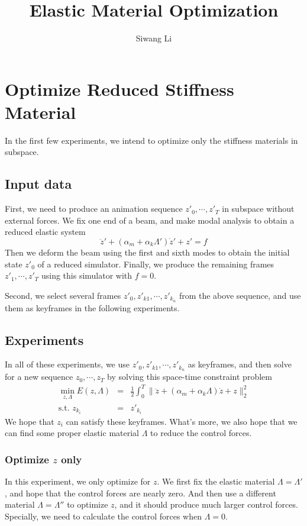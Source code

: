 \documentclass[9pt,twocolumn]{extarticle}
\author{Siwang Li}
\title{Elastic Material Optimization}
\begin{document}
\maketitle

\setlength{\parskip}{0.5ex}

\section{Optimize Reduced Stiffness Material}
In the first few experiments, we intend to optimize only the stiffness materials
in subspace.

\subsection{Input data}
First, we need to produce an animation sequence $z'_0,\cdots,z'_{T}$ in subspace
without external forces. We fix one end of a beam, and make modal analysis to
obtain a reduced elastic system
\begin{equation} \label{mq}
  \ddot{z}' + (\alpha_m+\alpha_k \Lambda')\dot{z}' + z' = f
\end{equation} 
Then we deform the beam using the first and sixth modes to obtain the initial
state $z'_0$ of a reduced simulator. Finally, we produce the remaining frames
$z'_1,\cdots,z'_{T}$ using this simulator with $f=0$. 

Second, we select several frames $z'_{0},z'_{k1},\cdots,z'_{k_n}$ from the above
sequence, and use them as keyframes in the following experiments.

\subsection{Experiments}
In all of these experiments, we use $z'_{0},z'_{k1},\cdots,z'_{k_n}$ as keyframes,
and then solve for a new sequence $z_0,\cdots,z_{T}$ by solving this
space-time constraint problem
\begin{eqnarray} \label{sp}
  \min_{z,\Lambda} E(z,\Lambda) &=& \frac{1}{2} \int_{0}^{T}\|\ddot{z} +
  (\alpha_m+\alpha_k \Lambda)\dot{z} + z\|_2^2\\
  \mbox{s.t. } z_{k_i} &=& z'_{k_i}
\end{eqnarray}
We hope that $z_i$ can satisfy these keyframes. What's
more, we also hope that we can find some proper elastic material $\Lambda$ to
reduce the control forces. 

\subsubsection{Optimize $z$ only}
In this experiment, we only optimize for $z$. We first fix the elastic material
$\Lambda = \Lambda'$, and hope that the control forces are nearly zero. And then
use a different material $\Lambda=\Lambda''$ to optimize $z$, and it should
produce much larger control forces. Specially, we need to calculate the control
forces when $\Lambda= 0$.
\end{document}
